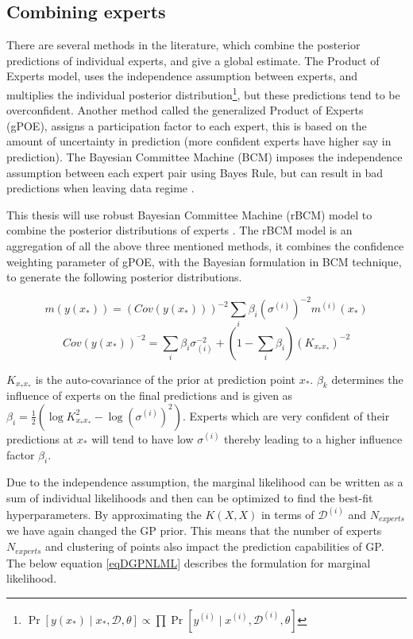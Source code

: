 \subsection{Combining experts}\label{subSecCombiningExperts}
There are several methods in the literature, which combine the posterior predictions of individual experts, and give a global estimate. The Product of Experts model, uses the independence assumption between experts, and multiplies the individual posterior distribution\footnote{$\Pr[y(x_{*}) \mid x_{*}, \mathcal{D}, \theta] \propto \prod \Pr[y^{(i)} \mid x^{(i)}, \mathcal{D}^{(i)}, \theta]$}, but these predictions tend to be overconfident. Another method called the generalized Product of Experts (gPOE), assigns a participation factor to each expert, this is based on the amount of uncertainty in prediction (more confident experts have higher say in prediction)\cite{cao2014generalized}. The Bayesian Committee Machine (BCM) imposes the independence assumption between each expert pair using Bayes Rule, but can result in bad predictions when leaving data regime \cite{tresp2000bayesian}. 

This thesis will use robust Bayesian Committee Machine (rBCM) model to combine the posterior distributions of experts \cite{deisenroth2015distributed}. The rBCM model is an aggregation of all the above three mentioned methods, it combines the confidence weighting parameter of gPOE, with the Bayesian formulation in BCM technique, to generate the following posterior distributions.

\begin{equation}\label{eqMeanDGP}
    m(y(x_{*})) = (Cov(y(x_{*})))^{-2}\sum_{i} \beta_{i}(\sigma^{(i)})^{-2}m^{(i)}(x_{*})
\end{equation}
\begin{equation}\label{eqCovarianceDGP}
    Cov(y(x_{*}))^{^-2} = \sum_{i} \beta_{i}\sigma_{(i)}^{-2} + (1- \sum_{i} \beta_{i})(K_{x_{*}x_{*}})^{-2}
\end{equation}


$K_{x_{*}x_{*}}$ is the auto-covariance of the prior at prediction point $x_{*}$. $\beta_{k}$ determines the influence of experts on the final predictions \cite{cao2014generalized} and is given as $\beta_{i} = \frac{1}{2}(\log K_{x_{*}x_{*}}^{2} - \log(\sigma^{(i)})^{2})$. Experts which are very confident of their predictions at $x_{*}$ will tend to have low $\sigma^{(i)}$ thereby leading to a higher influence factor $\beta_{i}$.

Due to the independence assumption, the marginal likelihood can be written as a sum of individual likelihoods and then can be optimized to find the best-fit hyperparameters. By approximating the $K(X, X)$ in terms of $\mathcal{D}^{(i)}$ and $N_{experts}$ we have again changed the GP prior. This means that the number of experts $N_{experts}$ and clustering of points also impact the prediction capabilities of GP. The below equation \ref{eqDGPNLML} describes the formulation for marginal likelihood. 

